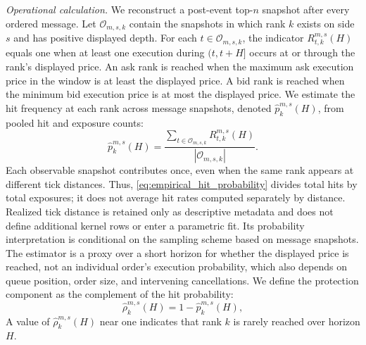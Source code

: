\documentclass[11pt]{article}
\newenvironment{review}{\begingroup\color{blue}}{\endgroup}
\begin{document}
\emph{Operational calculation.} We reconstruct \begin{review}a post-event top-$n$ snapshot after every ordered message\end{review}. Let
$\mathcal{O}_{m,s,k}$ contain the snapshots in which rank $k$ exists on side $s$ and has positive displayed depth. For
each $t\in\mathcal{O}_{m,s,k}$, the indicator $R^{m,s}_{t,k}(H)$ equals one when at least one execution during $(t,t+H]$ occurs
at or through the rank's displayed price. An ask rank is reached when the maximum ask execution price in the window is at least
the displayed price. A bid rank is reached when the minimum bid execution price is at most the displayed price. We estimate \begin{review}the hit frequency at each rank across message snapshots\end{review}, denoted $\widehat p^{m,s}_{k}(H)$, from pooled hit and exposure counts:
\begin{equation}
    \widehat p^{m,s}_{k}(H)
    =
    \frac{
        \sum_{t\in\mathcal{O}_{m,s,k}}R^{m,s}_{t,k}(H)
    }{
        |\mathcal{O}_{m,s,k}|
    }.
    \label{eq:empirical_hit_probability}
\end{equation}
Each observable snapshot contributes once, even when the same rank appears at different tick distances. Thus,
\cref{eq:empirical_hit_probability} divides total hits by total exposures; it does not average \begin{review}hit rates computed separately by distance\end{review}. Realized tick distance is retained only as descriptive metadata and does not define additional kernel rows or enter
a parametric fit. Its probability interpretation is conditional on \begin{review}the sampling scheme based on message snapshots\end{review}. The estimator is \begin{review}a proxy over a short horizon\end{review} for whether the displayed price is reached, not an individual order's execution probability, which also
depends on queue position, order size, and intervening cancellations.
We define the protection component as the complement of the hit probability:
\begin{equation}
    \widehat\rho^{m,s}_{k}(H)=1-\widehat p^{m,s}_{k}(H),
    \label{eq:empirical_protection_profile}
\end{equation}
A value of $\widehat\rho^{m,s}_{k}(H)$ near one indicates that rank $k$ is rarely reached over horizon $H$.
\end{document}
